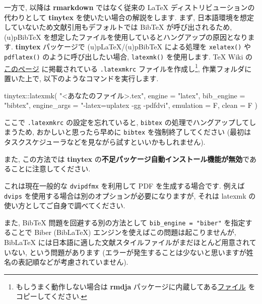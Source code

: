 \documentclass[
  xelatex,ja=standard,jafont=noto]{bxjsreport}
\newenvironment{Shaded}{\begin{snugshade}}{\end{snugshade}}
\newcommand{\AttributeTok}[1]{\textcolor[rgb]{0.77,0.63,0.00}{#1}}
\newcommand{\FunctionTok}[1]{\textcolor[rgb]{0.00,0.00,0.00}{#1}}
\newcommand{\NormalTok}[1]{#1}
\newcommand{\SpecialCharTok}[1]{\textcolor[rgb]{0.00,0.00,0.00}{#1}}
\newcommand{\StringTok}[1]{\textcolor[rgb]{0.31,0.60,0.02}{#1}}
\begin{document}
一方で, 以降は \textbf{rmarkdown} ではなく従来の LaTeX
ディストリビューションの代わりとして \textbf{tinytex}
を使いたい場合の解説をします. まず,
日本語環境を想定していないため文献引用もデフォルトでは BibTeX
が呼び出されるため, (u)pBibTeX
を想定したファイルを使用しているとハングアップの原因となります.
\textbf{tinytex} パッケージで (u)pLaTeX/(u)pBibTeX による処理を
\texttt{xelatex()} や \texttt{pdflatex()} のように呼び出したい場合,
\texttt{latexmk()} を使用します. TeX Wiki
の\href{https://texwiki.texjp.org/?Latexmk}{このページ} に掲載されている
\texttt{.latexmkrc} ファイルを作成し\footnote{もしうまく動作しない場合は
  \textbf{rmdja}
  パッケージに内蔵してある\href{https://github.com/Gedevan-Aleksizde/rmdja/blob/master/inst/resources/latexmk/.latexmkrc}{ファイル}
  をコピーしてください.}, 作業フォルダに置いた上で,
以下のようなコマンドを実行します.

\begin{Shaded}
\begin{Highlighting}[numbers=left,,]
\NormalTok{tinytex}\SpecialCharTok{::}\FunctionTok{latexmk}\NormalTok{(}
  \StringTok{"\textless{}あなたのファイル\textgreater{}.tex"}\NormalTok{,}
  \AttributeTok{engine =} \StringTok{"latex"}\NormalTok{,}
  \AttributeTok{bib\_engine =} \StringTok{"bibtex"}\NormalTok{,}
  \AttributeTok{engine\_args =} \StringTok{"{-}latex=uplatex {-}gg {-}pdfdvi"}\NormalTok{,}
  \AttributeTok{emulation =}\NormalTok{ F,}
  \AttributeTok{clean =}\NormalTok{ F}
\NormalTok{)}
\end{Highlighting}
\end{Shaded}

ここで \texttt{.latexmkrc} の設定を忘れていると, \texttt{bibtex}
の処理でハングアップしてしまうため, おかしいと思ったら早めに
\texttt{bibtex} を強制終了してください
(最初はタスクスケジューラなどを見ながら試すといいかもしれません).

また, この方法では \textbf{tinytex}
の\textbf{不足パッケージ自動インストール機能が無効}であることに注意してください.

これは現在一般的な \texttt{dvipdfmx} を利用して PDF を生成する場合です.
例えば \texttt{dvips} を使用する場合は別のオプションが必要になりますが,
それは latexmk の使い方としてご自身で調べてください.

また, BibTeX 問題を回避する別の方法として
\texttt{bib\_engine\ =\ "biber"} を指定することで Biber (BibLaTeX)
エンジンを使えばこの問題は起こりませんが, BibLaTeX
には日本語に適した文献スタイルファイルがまだほとんど用意されていない,
という問題があります
(エラーが発生することは少ないと思いますが姓名の表記順などが考慮されていません).
\end{document}
